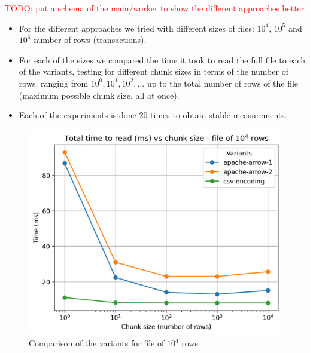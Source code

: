 \textcolor{red}{TODO: put a schema of the main/worker to show the different approaches better}

\begin{itemize}
  \item For the different approaches we tried with different sizes of files: $10^4$, $10^5$ and $10^6$ number of rows (transactions).
  \item For each of the sizes we compared the time it took to read the full file to each of the variants, testing for different chunk sizes in terms of the number of rows: ranging from $10^0, 10^1, 10^2,...$ up to the total number of rows of the file (maximum possible chunk size, all at once).
  \item Each of the experiments is done 20 times to obtain stable measurements.
\end{itemize}


\begin{figure}[H]
  \centering
  \includegraphics[scale = 0.7]{images/4-Experiments/read-input-10-4.png}
  \caption{Comparison of the variants for file of $10^4$ rows}
\end{figure}

